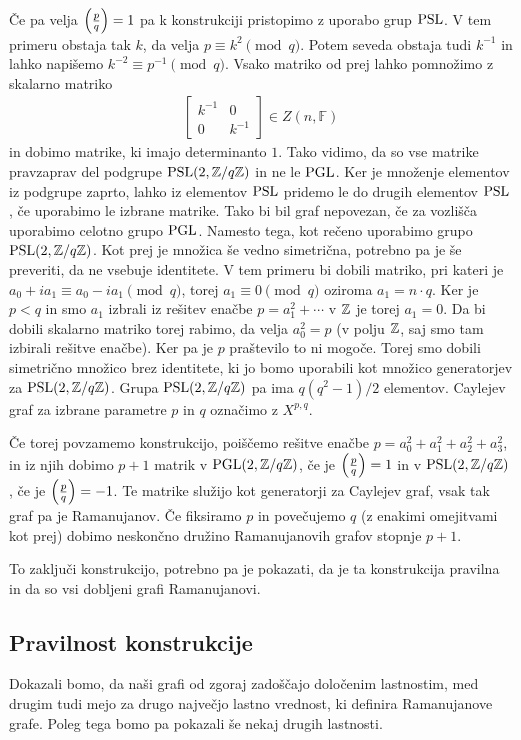 Če pa velja \(\left(\frac{p}{q}\right) = 1\) pa k konstrukciji pristopimo z uporabo grup \(\operatorname{PSL}\). V tem primeru obstaja tak \(k\), da velja \(p\equiv k^2 \pmod q\). Potem seveda obstaja tudi \(k^{-1}\) in lahko napišemo \(k^{-2} \equiv p^{-1}\pmod q\). Vsako matriko od prej lahko pomnožimo z skalarno matriko
\begin{align*}
    \begin{bmatrix}
        k^{-1} & 0 \\
        0 & k^{-1}
    \end{bmatrix}\in Z(n, \mathbb F)
\end{align*}
in dobimo matrike, ki imajo determinanto \(1\). Tako vidimo, da so vse matrike pravzaprav del podgrupe \(\operatorname{PSL}(2, \mathbb Z/q\mathbb Z)\) in ne le \(\operatorname{PGL}\). Ker je množenje elementov iz podgrupe zaprto, lahko iz elementov \(\operatorname{PSL}\) pridemo le do drugih elementov \(\operatorname{PSL}\), če uporabimo le izbrane matrike. Tako bi bil graf nepovezan, če za vozlišča uporabimo celotno grupo \(\operatorname{PGL}\). Namesto tega, kot rečeno uporabimo grupo \(\operatorname{PSL}(2, \mathbb Z/q\mathbb Z)\). Kot prej je množica še vedno simetrična, potrebno pa je še preveriti, da ne vsebuje identitete. V tem primeru bi dobili matriko, pri kateri je \(a_0 +ia_1 \equiv a_0 - ia_1 \pmod q\), torej \(a_1 \equiv 0 \pmod q\) oziroma \(a_1 = n\cdot q\). Ker je \(p<q\) in smo \(a_1\) izbrali iz rešitev enačbe \(p=a_1^2 + \cdots\) v \(\mathbb Z\) je torej \(a_1=0\). Da bi dobili skalarno matriko torej rabimo, da velja \(a_0^2 = p\) (v polju \(\mathbb Z\), saj smo tam izbirali rešitve enačbe). Ker pa je \(p\) praštevilo to ni mogoče. Torej smo dobili simetrično množico brez identitete, ki jo bomo uporabili kot množico generatorjev za \(\operatorname{PSL}(2, \mathbb Z/q\mathbb Z)\). Grupa \(\operatorname{PSL}(2, \mathbb Z/q\mathbb Z)\) pa ima \(q(q^2-1)/2\) elementov. Caylejev graf za izbrane parametre \(p\) in \(q\) označimo z \(X^{p,q}\).

Če torej povzamemo konstrukcijo, poiščemo rešitve enačbe \(p = a_0^2 + a_1^2 + a_2^2 + a_3^2\), in iz njih dobimo \(p+1\) matrik v \(\operatorname{PGL}(2, \mathbb Z/q\mathbb Z)\), če je \(\left(\frac{p}{q}\right)=1\) in v \(\operatorname{PSL}(2, \mathbb Z/q\mathbb Z)\), če je \(\left(\frac{p}{q}\right)=-1\). Te matrike služijo kot generatorji za Caylejev graf, vsak tak graf pa je Ramanujanov. Če fiksiramo \(p\) in povečujemo \(q\) (z enakimi omejitvami kot prej) dobimo neskončno družino Ramanujanovih grafov stopnje \(p+1\).

To zaključi konstrukcijo, potrebno pa je pokazati, da je ta konstrukcija pravilna in da so vsi dobljeni grafi Ramanujanovi.

\subsection{Pravilnost konstrukcije}
Dokazali bomo, da naši grafi od zgoraj zadoščajo določenim lastnostim, med drugim tudi mejo za drugo največjo lastno vrednost, ki definira Ramanujanove grafe. Poleg tega bomo pa pokazali še nekaj drugih lastnosti.

